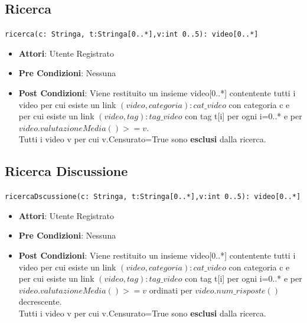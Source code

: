 \documentclass[12pt, letterpaper]{article}
\newcommand{\code}[1]{\colorbox{light-gray}{\texttt{#1}}}
\begin{document}
\subsection{Ricerca}
\code{ricerca(c: Stringa, t:Stringa[0..*],v:int 0..5): video[0..*]}
\begin{itemize}
    \item \textbf{Attori}: Utente Registrato
    \item \textbf{Pre Condizioni}: Nessuna
    \item \textbf{Post Condizioni}: Viene restituito un insieme video[0..*] contentente tutti i video per cui esiste un link $(video, categoria): cat\_video$ con categoria c e per cui esiste un link $(video, tag): tag\_video$ con tag t[i] per ogni i=0..* e per $video.valutazioneMedia() >=v$.
    \\Tutti i video v per cui v.Censurato=True sono \textbf{esclusi} dalla ricerca.
\end{itemize}
\subsection{Ricerca Discussione} 
\code{ricercaDscussione(c: Stringa, t:Stringa[0..*],v:int 0..5): video[0..*]}
\begin{itemize}
    \item \textbf{Attori}: Utente Registrato
    \item \textbf{Pre Condizioni}: Nessuna
    \item \textbf{Post Condizioni}: Viene restituito un insieme video[0..*] contentente tutti i video per cui esiste un link $(video, categoria): cat\_video$ con categoria c e per cui esiste un link $(video, tag): tag\_video$ con tag t[i] per ogni i=0..* e per $video.valutazioneMedia() >=v$
    ordinati per $video.num\_risposte()$ decrescente.
    \\Tutti i video v per cui v.Censurato=True sono \textbf{esclusi} dalla ricerca.
\end{itemize}
\end{document}
